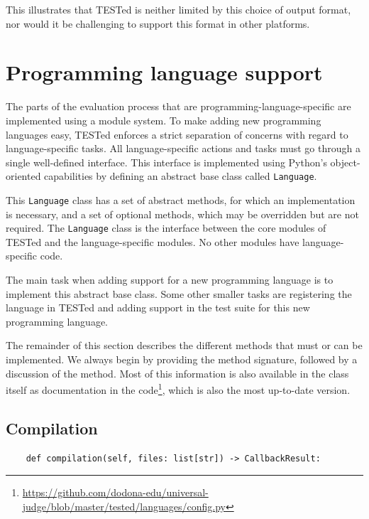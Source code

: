 \documentclass[../main]{subfiles}
\begin{document}
This illustrates that TESTed is neither limited by this choice of output format, nor would it be challenging to support this format in other platforms.

\section{Programming language support}\label{sec:programming-language-support}

The parts of the evaluation process that are programming-language-specific are implemented using a module system.
To make adding new programming languages easy, TESTed enforces a strict separation of concerns with regard to language-specific tasks.
All language-specific actions and tasks must go through a single well-defined interface.
This interface is implemented using Python's object-oriented capabilities by defining an abstract base class called \texttt{Language}.

This \texttt{Language} class has a set of abstract methods, for which an implementation is necessary, and a set of optional methods, which may be overridden but are not required.
The \texttt{Language} class is the interface between the core modules of TESTed and the language-specific modules.
No other modules have language-specific code.

The main task when adding support for a new programming language is to implement this abstract base class.
Some other smaller tasks are registering the language in TESTed and adding support in the test suite for this new programming language.

The remainder of this section describes the different methods that must or can be implemented.
We always begin by providing the method signature, followed by a discussion of the method.
Most of this information is also available in the class itself as documentation in the code\footnote{\url{https://github.com/dodona-edu/universal-judge/blob/master/tested/languages/config.py}}, which is also the most up-to-date version.

\subsection{Compilation}\label{subsec:impl-compilation}

\begin{verbatim}
    def compilation(self, files: list[str]) -> CallbackResult:
\end{verbatim}
\end{document}
